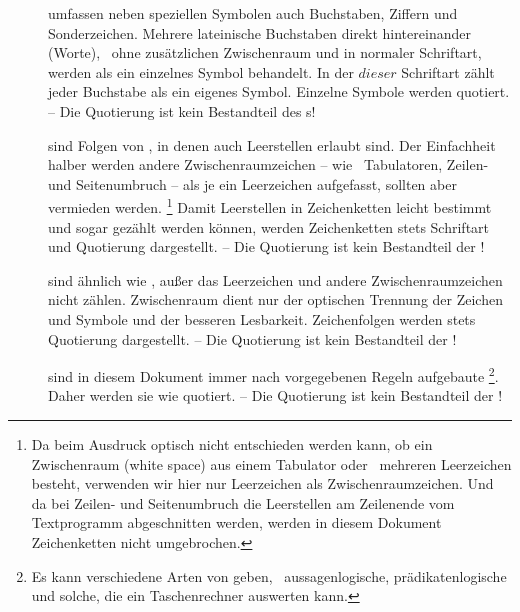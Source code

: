 \begin{description}
	\item[] umfassen neben speziellen Symbolen auch Buchstaben, Ziffern und Sonderzeichen.
	Mehrere lateinische Buchstaben direkt hintereinander (Worte), \textdh\ ohne zusätzlichen Zwischenraum und in $\text{normaler}$ Schriftart, werden als ein einzelnes Symbol behandelt.
	In der $dieser$ Schriftart zählt jeder Buchstabe als ein eigenes Symbol.
	Einzelne Symbole werden  quotiert.
	-- Die Quotierung ist kein Bestandteil des s!
	\item [] sind Folgen von , in denen auch Leerstellen erlaubt sind.
	Der Einfachheit halber werden andere Zwischenraumzeichen -- wie \textzB\ Tabulatoren, Zeilen- und Seitenumbruch -- als je ein Leerzeichen aufgefasst, sollten aber vermieden werden.%
	\footnote{%
		Da beim Ausdruck optisch nicht entschieden werden kann, ob ein Zwischenraum (white space) aus einem Tabulator oder \textevtl\ mehreren Leerzeichen besteht, verwenden wir hier nur Leerzeichen als Zwischenraumzeichen.
		Und da bei Zeilen- und Seitenumbruch die Leerstellen am Zeilenende vom Textprogramm abgeschnitten werden, werden in diesem Dokument Zeichenketten nicht umgebrochen.
	}
	Damit Leerstellen in Zeichenketten leicht bestimmt und sogar gezählt werden können,
	werden Zeichenketten stets  Schriftart und  Quotierung dargestellt.
	-- Die Quotierung ist kein Bestandteil der !
	\item [] sind ähnlich wie , außer das Leerzeichen und andere Zwischenraumzeichen nicht zählen.
	Zwischenraum dient nur der optischen Trennung der Zeichen und Symbole und der besseren Lesbarkeit.
	Zeichenfolgen werden stets  Quotierung dargestellt.
	-- Die Quotierung ist kein Bestandteil der !
	\item [] sind in diesem Dokument immer nach vorgegebenen Regeln aufgebaute %
	\footnote{%
		Es kann verschiedene Arten von  geben, \textzB\ aussagenlogische, prädikatenlogische und solche, die ein Taschenrechner auswerten kann.
	}.
	Daher werden sie wie  quotiert.
	-- Die Quotierung ist kein Bestandteil der !


\end{description}
